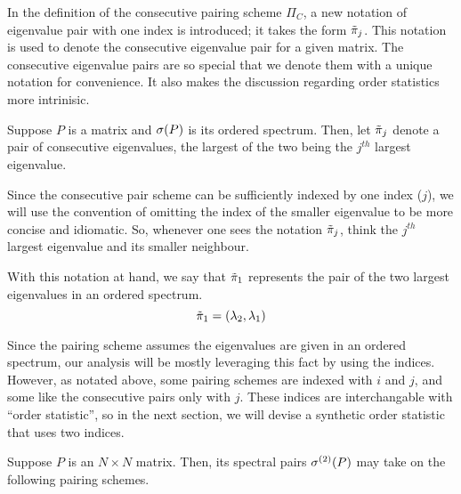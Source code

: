 \newpage
{}

In the definition of the consecutive pairing scheme $\Pi_C$, a new notation of eigenvalue pair with one index is introduced; it takes the form ${\tilde{\pi}}_j$. This notation is used to denote the consecutive eigenvalue pair for a given matrix. The consecutive eigenvalue pairs are so special that we denote them with a unique notation for convenience. It also makes the discussion regarding order statistics more intrinisic.

\begin{definition}
Suppose $P$ is a matrix and $\sigma(P)$ is its ordered spectrum. Then, let ${\tilde{\pi}}_j$ denote a pair of consecutive eigenvalues, the largest of the two being the $j^{th}$ largest eigenvalue.
\end{definition}

Since the consecutive pair scheme can be sufficiently indexed by one index ($j$), we will use the convention of omitting the index of the smaller eigenvalue to be more concise and idiomatic. So, whenever one sees the notation ${\tilde{\pi}}_j$, think the $j^{th}$ largest eigenvalue and its smaller neighbour.

\begin{example}
With this notation at hand, we say that ${\tilde{\pi}}_1$ represents the pair of the two largest eigenvalues in an ordered spectrum.
$${\tilde{\pi}}_1 = (\lambda_2,\lambda_1)$$
\end{example}

\begin{remark}
Since the pairing scheme assumes the eigenvalues are given in an ordered spectrum, our analysis will be mostly leveraging this fact by using the indices. However, as notated above, some pairing schemes are indexed with $i$ and $j$, and some like the consecutive pairs only with $j$. These indices are interchangable with ``order statistic'', so in the next section, we will devise a synthetic order statistic that uses two indices.
\end{remark}


Suppose $P$ is an $N \times N$ matrix. Then, its spectral pairs ${\sigma^{(2)}}(P)$ may take on the following pairing schemes. \newline
\begin{center}
\pairingschemetable %
\end{center}
\vspace{1em}

